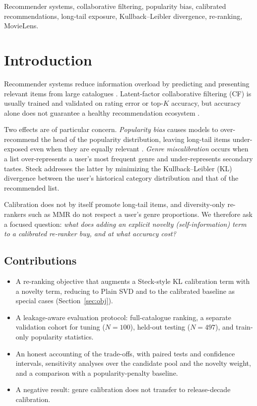 \documentclass[conference]{IEEEtran}
\begin{document}
  \begin{IEEEkeywords}
  Recommender systems, collaborative filtering, popularity bias, calibrated recommendations, long-tail exposure, Kullback--Leibler divergence, re-ranking, MovieLens.
  \end{IEEEkeywords}

  \section{Introduction}
  Recommender systems reduce information overload by predicting and presenting relevant items from large catalogues \cite{ricci2015}. Latent-factor collaborative filtering (CF) \cite{koren2009,funk2006} is usually trained and validated on rating error or top-$K$ accuracy, but accuracy alone does not guarantee a healthy recommendation ecosystem \cite{herlocker2004,vargas2011}.

  Two effects are of particular concern. \emph{Popularity bias} causes models to over-recommend the head of the popularity distribution, leaving long-tail items under-exposed even when they are equally relevant \cite{abdollahpouri2019,abdollahpouri2017,jannach2015}. \emph{Genre miscalibration} occurs when a list over-represents a user's most frequent genre and under-represents secondary tastes. Steck \cite{steck2018} addresses the latter by minimizing the Kullback--Leibler (KL) divergence between the user's historical category distribution and that of the recommended list.

  Calibration does not by itself promote long-tail items, and diversity-only re-rankers such as MMR \cite{carbonell1998} do not respect a user's genre proportions. We therefore ask a focused question: \emph{what does adding an explicit novelty (self-information) term to a calibrated re-ranker buy, and at what accuracy cost?}

  \subsection{Contributions}
  \begin{itemize}
    \item A re-ranking objective that augments a Steck-style KL calibration term with a novelty term, reducing to Plain SVD and to the calibrated baseline as special cases (Section~\ref{sec:obj}).
    \item A leakage-aware evaluation protocol: full-catalogue ranking, a separate validation cohort for tuning ($N=100$), held-out testing ($N=497$), and train-only popularity statistics.
    \item An honest accounting of the trade-offs, with paired tests and confidence intervals, sensitivity analyses over the candidate pool and the novelty weight, and a comparison with a popularity-penalty baseline.
    \item A negative result: genre calibration does not transfer to release-decade calibration.
  \end{itemize}
\end{document}
